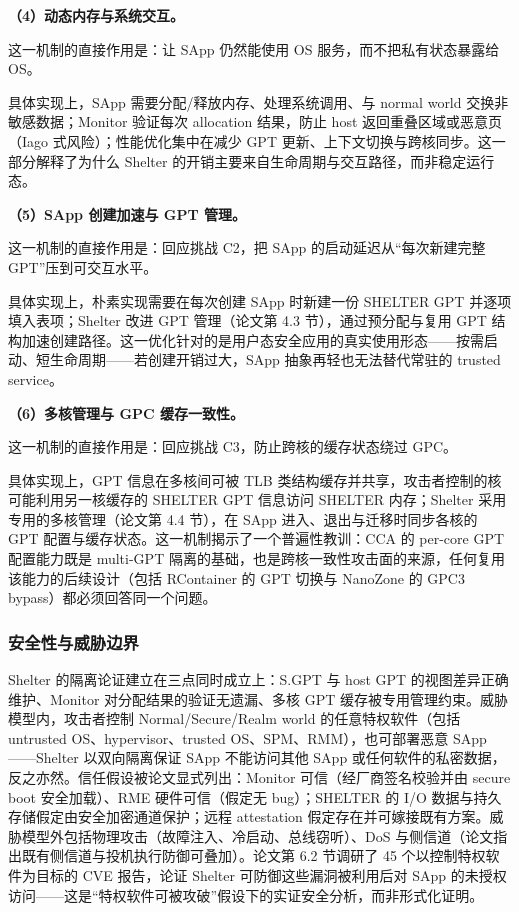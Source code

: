 \documentclass[11pt]{ctexart}
\begin{document}
\noindent\textbf{（4）动态内存与系统交互。}\par
这一机制的直接作用是：让 SApp 仍然能使用 OS 服务，而不把私有状态暴露给 OS。\par
具体实现上，SApp 需要分配/释放内存、处理系统调用、与 normal world 交换非敏感数据；Monitor 验证每次 allocation 结果，防止 host 返回重叠区域或恶意页（Iago 式风险）；性能优化集中在减少 GPT 更新、上下文切换与跨核同步。这一部分解释了为什么 Shelter 的开销主要来自生命周期与交互路径，而非稳定运行态。\par
\noindent\textbf{（5）SApp 创建加速与 GPT 管理。}\par
这一机制的直接作用是：回应挑战 C2，把 SApp 的启动延迟从“每次新建完整 GPT”压到可交互水平。\par
具体实现上，朴素实现需要在每次创建 SApp 时新建一份 SHELTER GPT 并逐项填入表项；Shelter 改进 GPT 管理（论文第 4.3 节），通过预分配与复用 GPT 结构加速创建路径。这一优化针对的是用户态安全应用的真实使用形态——按需启动、短生命周期——若创建开销过大，SApp 抽象再轻也无法替代常驻的 trusted service。\par
\noindent\textbf{（6）多核管理与 GPC 缓存一致性。}\par
这一机制的直接作用是：回应挑战 C3，防止跨核的缓存状态绕过 GPC。\par
具体实现上，GPT 信息在多核间可被 TLB 类结构缓存并共享，攻击者控制的核可能利用另一核缓存的 SHELTER GPT 信息访问 SHELTER 内存；Shelter 采用专用的多核管理（论文第 4.4 节），在 SApp 进入、退出与迁移时同步各核的 GPT 配置与缓存状态。这一机制揭示了一个普遍性教训：CCA 的 per-core GPT 配置能力既是 multi-GPT 隔离的基础，也是跨核一致性攻击面的来源，任何复用该能力的后续设计（包括 RContainer 的 GPT 切换与 NanoZone 的 GPC3 bypass）都必须回答同一个问题。\par
\subsubsection{安全性与威胁边界}
Shelter 的隔离论证建立在三点同时成立上：S.GPT 与 host GPT 的视图差异正确维护、Monitor 对分配结果的验证无遗漏、多核 GPT 缓存被专用管理约束。威胁模型内，攻击者控制 Normal/Secure/Realm world 的任意特权软件（包括 untrusted OS、hypervisor、trusted OS、SPM、RMM），也可部署恶意 SApp——Shelter 以双向隔离保证 SApp 不能访问其他 SApp 或任何软件的私密数据，反之亦然。信任假设被论文显式列出：Monitor 可信（经厂商签名校验并由 secure boot 安全加载）、RME 硬件可信（假定无 bug）；SHELTER 的 I/O 数据与持久存储假定由安全加密通道保护；远程 attestation 假定存在并可嫁接既有方案。威胁模型外包括物理攻击（故障注入、冷启动、总线窃听）、DoS 与侧信道（论文指出既有侧信道与投机执行防御可叠加）。论文第 6.2 节调研了 45 个以控制特权软件为目标的 CVE 报告，论证 Shelter 可防御这些漏洞被利用后对 SApp 的未授权访问——这是“特权软件可被攻破”假设下的实证安全分析，而非形式化证明。\par
\end{document}
